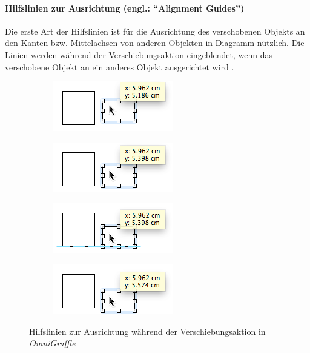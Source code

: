 \paragraph{Hilfslinien zur Ausrichtung (engl.: \enquote{Alignment Guides})}

Die erste Art der Hilfslinien ist für die Ausrichtung des verschobenen Objekts an den Kanten bzw. Mittelachsen von anderen Objekten in Diagramm nützlich. Die Linien werden während der Verschiebungsaktion eingeblendet, wenn das verschobene Objekt an ein anderes Objekt ausgerichtet wird \cite{11Keynote}.

\begin{figure}[hbt]
    \newcommand{\subfigurewidth}{0.5\textwidth}
    \begin{subfigure}{\subfigurewidth}
        \centering
        \includegraphics{assets/omnigraffle-smart-guides-a}
        \caption{}
        \label{fig:omnigraffle-smart-guides-a}
    \end{subfigure}
    \begin{subfigure}{\subfigurewidth}
        \centering
        \includegraphics{assets/omnigraffle-smart-guides-b}
        \caption{}
        \label{fig:omnigraffle-smart-guides-b}
    \end{subfigure}
    \begin{subfigure}{\subfigurewidth}
        \centering
        \includegraphics{assets/omnigraffle-smart-guides-c}
        \caption{}
        \label{fig:omnigraffle-smart-guides-c}
    \end{subfigure}
    \begin{subfigure}{\subfigurewidth}
        \centering
        \includegraphics{assets/omnigraffle-smart-guides-d}
        \caption{}
        \label{fig:omnigraffle-smart-guides-d}
    \end{subfigure}
    \caption{Hilfslinien zur Ausrichtung während der Verschiebungsaktion in \textit{OmniGraffle}}
    \label{fig:omnigraffle-smart-guides}
\end{figure}

